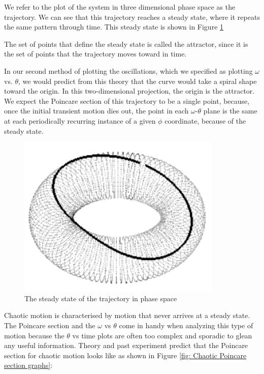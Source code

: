 \documentclass[twocolumn,amsmath,amssymb,pra, floatfix]{revtex4-2}
\begin{document}
We refer to the plot of the system in three dimensional phase space as the trajectory. We can see that this trajectory reaches a steady state, where it repeats the same pattern through time. This steady state is shown in Figure \ref{fig: sine wave phase space attractor}

The set of points that define the steady state is called the attractor, since it is the set of points that the trajectory moves toward in time. 

In our second method of plotting the oscillations, which we specified as plotting $\omega$ vs. $\theta$, we would predict from this theory that the curve would take a spiral shape toward the origin. In this two-dimensional projection, the origin is the attractor. We expect the Poincare section of this trajectory to be a single point, because, once the initial transient motion dies out, the point in each $\omega$-$\theta$ plane is the same at each periodically recurring instance of a given $\phi$ coordinate, because of the steady state.

\begin{figure}
    \centering
    \includegraphics[width = 0.5\linewidth]{images/attractor_sine_wave.png}
    \caption{The steady state of the trajectory in phase space}
    \label{fig: sine wave phase space attractor}
\end{figure}

Chaotic motion is characterised by motion that never arrives at a steady state. The Poincare section and the $\omega$ vs $\theta$ come in handy when analyzing this type of motion because the $\theta$ vs time plots are often too complex and sporadic to glean any useful information. Theory and past experiment predict that the Poincare section for chaotic motion looks like as shown in Figure \ref{fig: Chaotic Poincare section graphs}:
\end{document}
